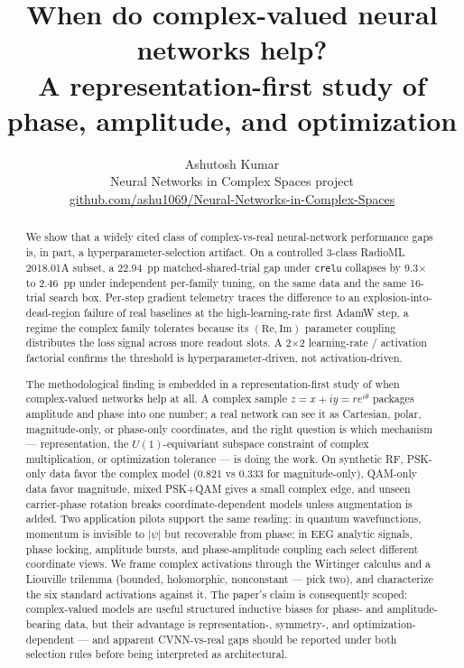 \documentclass{article}
\title{When do complex-valued neural networks help?\\
A representation-first study of phase, amplitude, and optimization}
\author{%
  Ashutosh Kumar\\
  \small{Neural Networks in Complex Spaces project}\\
  \small{\url{github.com/ashu1069/Neural-Networks-in-Complex-Spaces}}%
}
\date{}
\newcommand{\code}[1]{\texttt{#1}}
\begin{document}
\maketitle

\begin{abstract}
We show that a widely cited class of complex-vs-real neural-network
performance gaps is, in part, a hyperparameter-selection artifact.
On a controlled 3-class RadioML 2018.01A subset, a 22.94~pp
matched-shared-trial gap under \code{crelu} collapses by
9.3$\times$ to 2.46~pp under independent per-family tuning, on the
same data and the same 16-trial search box. Per-step gradient
telemetry traces the difference to an explosion-into-dead-region
failure of real baselines at the high-learning-rate first AdamW step,
a regime the complex family tolerates because its
$(\mathrm{Re},\mathrm{Im})$ parameter coupling distributes the loss
signal across more readout slots. A 2$\times$2 learning-rate / activation
factorial confirms the threshold is hyperparameter-driven, not
activation-driven.

The methodological finding is embedded in a representation-first study
of when complex-valued networks help at all. A complex sample
$z=x+iy=re^{i\theta}$ packages amplitude and phase into one number; a
real network can see it as Cartesian, polar, magnitude-only, or
phase-only coordinates, and the right question is which mechanism
--- representation, the $U(1)$-equivariant subspace constraint of
complex multiplication, or optimization tolerance --- is doing the
work. On synthetic RF, PSK-only data favor the complex model (0.821 vs
0.333 for magnitude-only), QAM-only data favor magnitude, mixed PSK+QAM
gives a small complex edge, and unseen carrier-phase rotation breaks
coordinate-dependent models unless augmentation is added. Two
application pilots support the same reading: in quantum wavefunctions,
momentum is invisible to $|\psi|$ but recoverable from phase; in EEG
analytic signals, phase locking, amplitude bursts, and phase-amplitude
coupling each select different coordinate views. We frame complex
activations through the Wirtinger calculus and a Liouville trilemma
(bounded, holomorphic, nonconstant --- pick two), and characterize the
six standard activations against it. The paper's claim is
consequently scoped: complex-valued models are useful structured
inductive biases for phase- and amplitude-bearing data, but their
advantage is representation-, symmetry-, and optimization-dependent
--- and apparent CVNN-vs-real gaps should be reported under both
selection rules before being interpreted as architectural.
\end{abstract}
\end{document}
